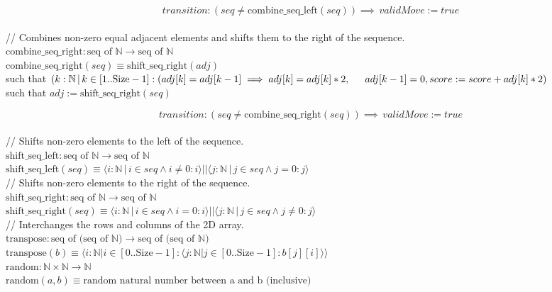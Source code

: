 \documentclass[12pt]{article}
\begin{document}
$$transition: (seq \neq \text{combine\_seq\_left}(seq))\implies \, validMove:=true$$\\

\noindent // Combines non-zero equal adjacent elements and shifts them to the right of the sequence.\\
\noindent $\mbox{combine\_seq\_right}: \text{seq of } \mathbb{N} \rightarrow \text{seq of } \mathbb{N}$\\
\noindent 
$\mbox{combine\_seq\_right}(seq) \equiv \text{shift\_seq\_right}(adj)$\\
\indent such that $(k:\mathbb{N}\,|\,k \in [1..\text{Size}-1] : (adj[k]=adj[k-1]\implies adj[k]=adj[k]*2,\\ \indent adj[k-1]=0,score:=score+adj[k]*2)$\\
\indent such that $adj := \text{shift\_seq\_right}(seq)$

$$transition: (seq \neq \text{combine\_seq\_right}(seq))\implies \, validMove:=true$$\\

\noindent // Shifts non-zero elements to the left of the sequence.\\
\noindent $\mbox{shift\_seq\_left}: \text{seq of } \mathbb{N} \rightarrow \text{seq of } \mathbb{N}$\\
\noindent 
$\mbox{shift\_seq\_left}(seq) \equiv \langle i:\mathbb{N}\,|\,i \in seq \wedge i \neq 0: i\rangle || \langle j:\mathbb{N}\,|\,j \in seq \wedge j = 0: j\rangle$\\

\noindent // Shifts non-zero elements to the right of the sequence.\\
\noindent $\mbox{shift\_seq\_right}: \text{seq of } \mathbb{N} \rightarrow \text{seq of } \mathbb{N}$\\
\noindent 
$\mbox{shift\_seq\_right}(seq) \equiv \langle i:\mathbb{N}\,|\,i \in seq \wedge i = 0: i\rangle || \langle j:\mathbb{N}\,|\,j \in seq \wedge j \neq 0: j\rangle$\\

\noindent // Interchanges the rows and columns of the 2D array.\\
\noindent $\mbox{transpose}: \text{seq of (seq of }\mathbb{N})  \rightarrow \text{seq of (seq of }\mathbb{N})$\\
\noindent
$\mbox{transpose}(b) \equiv \langle i:\mathbb{N}|i\in[0..\text{Size}-1]:\langle j:\mathbb{N}|j\in[0..\text{Size}-1]:b[j][i] \rangle \rangle$\\

\noindent $\mbox{random}: \mathbb{N}\times\mathbb{N} \rightarrow \mathbb{N}$\\
\noindent
$\mbox{random}(a,b) \equiv \text{random natural number between a and b (inclusive)}$
\end{document}
